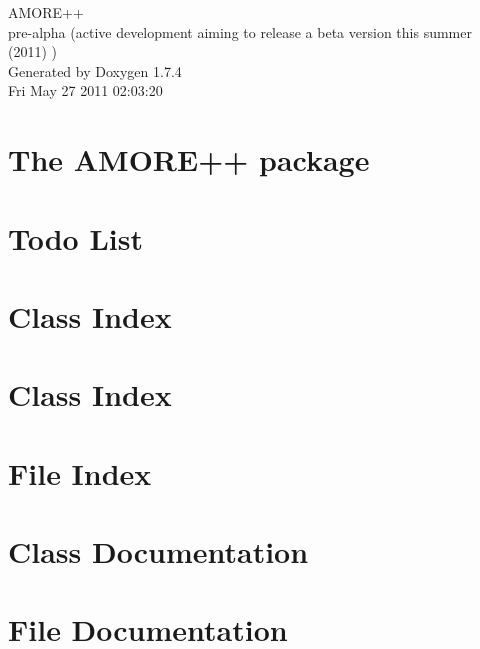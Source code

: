 \documentclass[a4paper]{book}
\begin{document}
\hypersetup{pageanchor=false}
\begin{titlepage}
\vspace*{7cm}
\begin{center}
{\Large AMORE++ \\[1ex]\large pre-\/alpha (active development aiming to release a beta version this summer (2011) ) }\\
\vspace*{1cm}
{\large Generated by Doxygen 1.7.4}\\
\vspace*{0.5cm}
{\small Fri May 27 2011 02:03:20}\\
\end{center}
\end{titlepage}
\clearemptydoublepage
{}
\tableofcontents
\clearemptydoublepage
{}
\hypersetup{pageanchor=true}
\chapter{The AMORE++ package}
\label{index}\hypertarget{index}{}
\chapter{Todo List}
\label{todo}
\hypertarget{todo}{}

\chapter{Class Index}

\chapter{Class Index}

\chapter{File Index}

\chapter{Class Documentation}




\chapter{File Documentation}









\printindex
\end{document}
